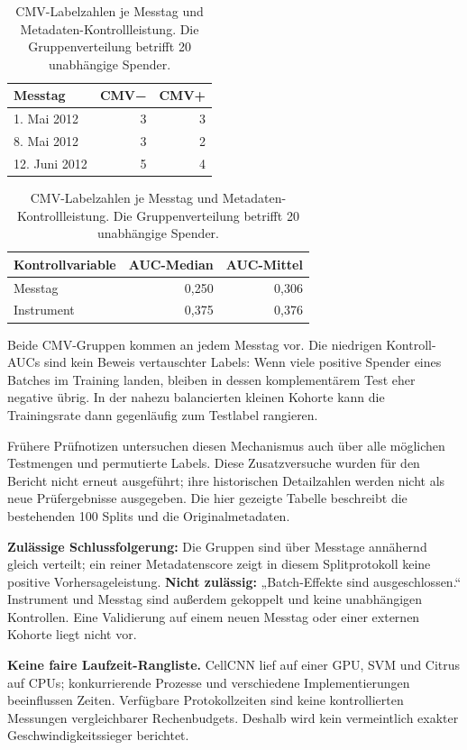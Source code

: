 \documentclass[11pt,a4paper]{article}
\begin{document}
\begin{table}[!ht]\centering
\caption{CMV-Labelzahlen je Messtag und Metadaten-Kontrollleistung.
Die Gruppenverteilung betrifft 20 unabhängige Spender.}
\begin{tabular}{lrr}\toprule
Messtag & CMV− & CMV+\\\midrule
1. Mai 2012 & 3 & 3\\
8. Mai 2012 & 3 & 2\\
12. Juni 2012 & 5 & 4\\\bottomrule
\end{tabular}\qquad
\begin{tabular}{lrr}\toprule
Kontrollvariable & AUC-Median & AUC-Mittel\\\midrule
Messtag & 0,250 & 0,306\\
Instrument & 0,375 & 0,376\\\bottomrule
\end{tabular}
\end{table}

Beide CMV-Gruppen kommen an jedem Messtag vor. Die niedrigen Kontroll-AUCs
sind kein Beweis vertauschter Labels: Wenn viele positive Spender eines
Batches im Training landen, bleiben in dessen komplementärem Test eher
negative übrig. In der nahezu balancierten kleinen Kohorte kann die
Trainingsrate dann gegenläufig zum Testlabel rangieren.

Frühere Prüfnotizen untersuchen diesen Mechanismus auch über alle möglichen
Testmengen und permutierte Labels. Diese Zusatzversuche wurden für den
Bericht nicht erneut ausgeführt; ihre historischen Detailzahlen werden
nicht als neue Prüfergebnisse ausgegeben. Die hier gezeigte Tabelle
beschreibt die bestehenden 100 Splits und die Originalmetadaten.

\textbf{Zulässige Schlussfolgerung:} Die Gruppen sind über Messtage
annähernd gleich verteilt; ein reiner Metadatenscore zeigt in diesem
Splitprotokoll keine positive Vorhersageleistung. \textbf{Nicht zulässig:}
„Batch-Effekte sind ausgeschlossen.“ Instrument und Messtag sind außerdem
gekoppelt und keine unabhängigen Kontrollen. Eine Validierung auf einem
neuen Messtag oder einer externen Kohorte liegt nicht vor.

\textbf{Keine faire Laufzeit-Rangliste.} CellCNN lief auf einer GPU,
SVM und Citrus auf CPUs; konkurrierende Prozesse und verschiedene
Implementierungen beeinflussen Zeiten. Verfügbare Protokollzeiten sind
keine kontrollierten Messungen vergleichbarer Rechenbudgets. Deshalb
wird kein vermeintlich exakter Geschwindigkeitssieger berichtet.
\end{document}
